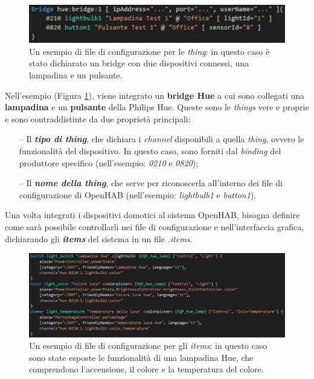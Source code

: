\begin{figure}[!ht]
  \centering
  \includegraphics[scale=0.65]{resources/images/implementation/code/thing-code-example.jpg}
  \caption{
    Un esempio di file di configurazione per le \textit{thing}: in questo caso
    è stato dichiarato un bridge con due dispositivi connessi, una lampadina e
    un pulsante.
  }
  \label{fig:figure5.2}
\end{figure}

Nell’esempio (Figura \ref{fig:figure5.2}), viene integrato un \textbf{bridge
Hue} a cui sono collegati una \textbf{lampadina} e un \textbf{pulsante} della
Philips Hue. Queste sono le \textit{things} vere e proprie e sono
contraddistinte da due proprietà principali:
\begin{itemize}
  \item[--] Il \textit{\textbf{tipo di thing}}, che dichiara i \textit{channel}
        disponibili a quella \textit{thing}, ovvero le funzionalità del
        dispositivo. In questo caso, sono forniti dal \textit{binding} del
        produttore specifico (nell’esempio: \textit{0210} e \textit{0820});
  \item[--] Il \textit{\textbf{nome della thing}}, che serve per riconoscerla
        all’interno dei file di configurazione di OpenHAB (nell’esempio:
        \textit{lightbulb1} e \textit{button1}).
\end{itemize}

Una volta integrati i dispositivi domotici al sistema OpenHAB, bisogna definire
come sarà possibile controllarli nei file di configurazione e nell’interfaccia
grafica, dichiarando gli \textit{\textbf{items}} del sistema in un file
\textit{.items}.

\begin{figure}[!ht]
  \centering
  \includegraphics[scale=0.48]{resources/images/implementation/code/items-code-example.jpg}
  \caption{
    Un esempio di file di configurazione per gli \textit{items}: in questo caso
    sono state esposte le funzionalità di una lampadina Hue, che comprendono
    l'accensione, il colore e la temperatura del colore.
  }
  \label{fig:figure5.3}
\end{figure}


